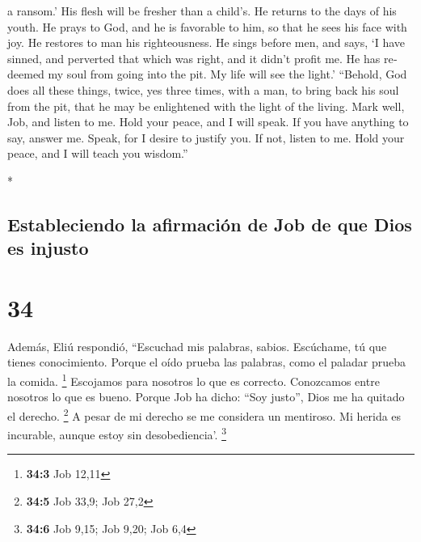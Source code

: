 \begin{paracol}{2}
\begin{otherlanguage}{english}
a ransom.'  His flesh will be fresher than a child's. He
returns to the days of his youth.  He prays to God, and
he is favorable to him, so that he sees his face with joy. He restores
to man his righteousness.  He sings before men, and says,
`I have sinned, and perverted that which was right, and it didn't profit
me.  He has redeemed my soul from going into the pit. My
life will see the light.'  ``Behold, God does all these
things, twice, yes three times, with a man,  to bring
back his soul from the pit, that he may be enlightened with the light of
the living.  Mark well, Job, and listen to me. Hold your
peace, and I will speak.  If you have anything to say,
answer me. Speak, for I desire to justify you.  If not,
listen to me. Hold your peace, and I will teach you wisdom.''

\end{otherlanguage}

\switchcolumn[0]*

\hypertarget{estableciendo-la-afirmaciuxf3n-de-job-de-que-dios-es-injusto}{%
\subsection{Estableciendo la afirmación de Job de que Dios es
injusto}\label{estableciendo-la-afirmaciuxf3n-de-job-de-que-dios-es-injusto}}

\hypertarget{section-66}{%
\section{34}\label{section-66}}

 Además, Eliú respondió,  ``Escuchad mis
palabras, sabios. Escúchame, tú que tienes conocimiento. 
Porque el oído prueba las palabras, como el paladar prueba la comida.
\footnote{\textbf{34:3} Job 12,11}  Escojamos para
nosotros lo que es correcto. Conozcamos entre nosotros lo que es bueno.
 Porque Job ha dicho: ``Soy justo'', Dios me ha quitado el
derecho. \footnote{\textbf{34:5} Job 33,9; Job 27,2}  A
pesar de mi derecho se me considera un mentiroso. Mi herida es
incurable, aunque estoy sin desobediencia'. \footnote{\textbf{34:6} Job
  9,15; Job 9,20; Job 6,4}

\hypertarget{al-blasfemar-contra-dios-job-se-vuelve-inicuo-porque-dios-no-puede-ser-injusto-seguxfan-todo-su-ser-especialmente-como-gobernante-del-mundo}{%
}
\end{paracol}
